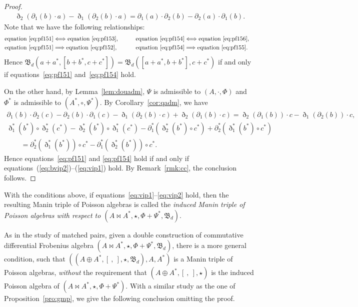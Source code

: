 \documentclass[10pt,a4paper]{amsart}
\numberwithin{equation}{section}
\begin{document}
\begin{proof}
\begin{gather}
 \eth_2(\partial_1(b) \cdot a) - \eth_1(\partial_2(b) \cdot a) = \partial_1(a) \cdot \partial_2(b) - \partial_2(a) \cdot \partial_1(b). \label{eq:pf156}
 \end{gather}
 Note that we have the following relationships:
 \begin{alignat*}{3}
 &{\rm equation~\eqref{eq:pf151}} \Longleftrightarrow {\rm equation~\eqref{eq:pf153}}, \qquad&&
 {\rm equation~\eqref{eq:pf154}} \Longleftrightarrow {\rm equation~\eqref{eq:pf156}}, &\\
 &{\rm equation~\eqref{eq:pf151}} \Longrightarrow {\rm equation~\eqref{eq:pf152}}, \qquad&&
 {\rm equation~\eqref{eq:pf154}} \Longrightarrow {\rm equation~\eqref{eq:pf155}}.&
 \end{alignat*}
 Hence $\mathfrak{B}_d(a + a^*, [b + b^*, c + c^*]) = \mathfrak{B}_d([a + a^*, b + b^*], c + c^*)$ if and only if equations~\eqref{eq:pf151} and~\eqref{eq:pf154} hold.

 On the other hand, by Lemma~\ref{lem:douadm},
 $\Psi$ is admissible to $(A, \cdot, \Phi)$ and $\Phi^*$ is admissible to $(A^*, \circ, \Psi^*)$.
 By Corollary~\ref{cor:qadm}, we have
 \begin{gather*}
 \partial_1(b) \cdot \partial_2(c) - \partial_2(b) \cdot \partial_1(c) - \eth_1(\partial_2(b) \cdot c) + \eth_2(\partial_1(b) \cdot c) = \eth_2(\partial_1(b)) \cdot c - \eth_1(\partial_2(b)) \cdot c,\\
 \eth_1^{*}(b^*) \circ \eth_2^{*}(c^*) - \eth_2^{*}(b^*) \circ \eth_1^{*}(c^*) - \partial_1^{*}(\eth_2^{*}(b^*) \circ c^*) + \partial_2^{*}(\eth_1^{*}(b^*) \circ c^*) \\
 \qquad{} = \partial_2^*(\eth_1^*(b^*)) \circ c^* - \partial_1^*(\eth_2^*(b^*)) \circ c^*.
 \end{gather*}
 Hence equations~\eqref{eq:pf151} and \eqref{eq:pf154} hold if and only if equations~(\ref{eq:bvip2})--(\ref{eq:vip1}) hold.
 By Remark~\ref{rmk:cc}, the conclusion follows.
\end{proof}

With the conditions above, if equations~\eqref{eq:vip1}--\eqref{eq:vip2} hold, then the resulting Manin triple of Poisson algebras is called the \textit{induced Manin triple of Poisson algebras with respect to $(A \bowtie A^*, \star, \Phi + \Psi^*, \mathfrak{B}_d)$}.

As in the study of matched pairs, given a double construction of commutative differential Frobenius algebra $(A \bowtie A^*, \star, \Phi + \Psi^*, \mathfrak{B}_d)$,
there is a more general condition, such that $((A \oplus A^*,\allowbreak [\ ,\ ], \star, \mathfrak{B}_d), A, A^*)$ is a Manin triple of Poisson algebras,
\textit{without} the requirement that $(A \oplus A^*,\allowbreak [\ ,\ ], \star)$ is the induced Poisson algebra of $(A \bowtie A^*, \star, \Phi + \Psi^*)$.
With a similar study as the one of Proposition~\ref{pro:gmp}, we give the following conclusion omitting the proof.
\end{document}

